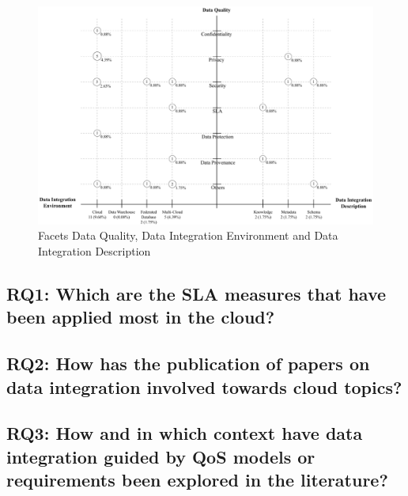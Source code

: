 \begin{figure}[!h]
\centering
\includegraphics[scale=0.53]{figs/bubble-charts/Data-Quality-DI.pdf}
\caption{Facets Data Quality, Data Integration Environment and Data Integration Description}\label{fig:facet4}
\end{figure}

\subsection{RQ1: Which are the SLA measures that have been applied most in
the cloud?}

\subsection{RQ2: How has the publication of papers on data integration
involved towards cloud topics?}


\subsection{RQ3: How and in which context have data integration guided by QoS
models or requirements been explored in the literature?}